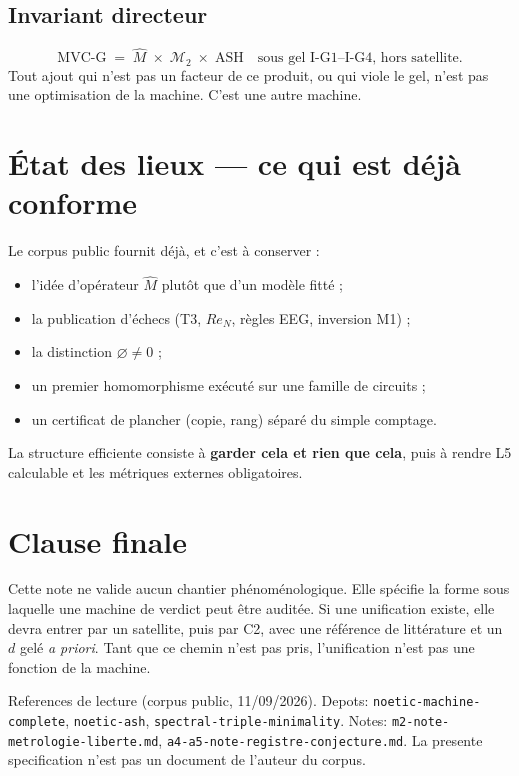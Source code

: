 \documentclass[11pt,a4paper]{article}
\newcommand{\Mhat}{\hat{M}}
\newcommand{\Mtwo}{\mathcal{M}_{2}}
\theoremstyle{definition}
\begin{document}
\subsection{Invariant directeur}

\[
\boxed{\;
\mathrm{MVC\text{-}G}
\;=\;
\Mhat \;\times\; \Mtwo \;\times\; \mathrm{ASH}
\quad\text{sous gel I-G1--I-G4, hors satellite.}
\;}
\]
Tout ajout qui n'est pas un facteur de ce produit, ou qui viole le gel, n'est pas une optimisation de la machine. C'est une autre machine.

\section{État des lieux --- ce qui est déjà conforme}

Le corpus public fournit déjà, et c'est à conserver :
\begin{itemize}
  \item l'idée d'opérateur \(\Mhat\) plutôt que d'un modèle fitté ;
  \item la publication d'échecs (T3, \(Re_N\), règles EEG, inversion M1) ;
  \item la distinction \(\varnothing\neq 0\) ;
  \item un premier homomorphisme exécuté sur une famille de circuits ;
  \item un certificat de plancher (copie, rang) séparé du simple comptage.
\end{itemize}
La structure efficiente consiste à \textbf{garder cela et rien que cela}, puis à rendre L5 calculable et les métriques externes obligatoires.

\section{Clause finale}

Cette note ne valide aucun chantier phénoménologique. Elle spécifie la forme sous laquelle une machine de verdict peut être auditée. Si une unification existe, elle devra entrer par un satellite, puis par C2, avec une référence de littérature et un \(d\) gelé \emph{a priori}. Tant que ce chemin n'est pas pris, l'unification n'est pas une fonction de la machine.

\vspace{1.2em}
{\small
\noindent
References de lecture (corpus public, 11/09/2026).
Depots:
\texttt{noetic-machine-complete},
\texttt{noetic-ash},
\texttt{spectral-triple-minimality}.
Notes:
\texttt{m2-note-metrologie-liberte.md},
\texttt{a4-a5-note-registre-conjecture.md}.
La presente specification n'est pas un document de l'auteur du corpus.
}
\end{document}
